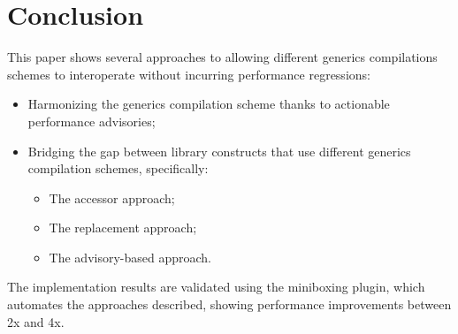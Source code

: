 \vspace{-1.0em}

\section{Conclusion}

\vspace{-0.5em}

This paper shows several approaches to allowing different generics compilations schemes to interoperate without incurring performance regressions:

\begin{itemize}
\item Harmonizing the generics compilation scheme thanks to actionable performance advisories;
\item Bridging the gap between library constructs that use different generics compilation schemes, specifically:
  \begin{itemize}
    \item The accessor approach;
    \item The replacement approach;
    \item The advisory-based approach.
  \end{itemize}
\end{itemize}

The implementation results are validated using the miniboxing plugin, which automates the approaches described, showing performance improvements between 2x and 4x.

\vspace{-1.2em}
